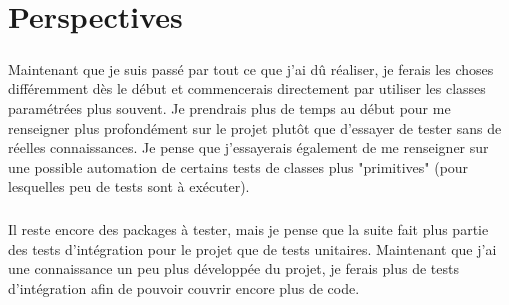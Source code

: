 \chapter{Perspectives}

\paragraph{}
Maintenant que je suis passé par tout ce que j'ai dû réaliser, je ferais les choses différemment dès le début et commencerais directement par utiliser les classes paramétrées plus souvent. Je prendrais plus de temps au début pour me renseigner plus profondément sur le projet plutôt que d'essayer de tester sans de réelles connaissances. Je pense que j'essayerais également de me renseigner sur une possible automation de certains tests de classes plus "primitives" (pour lesquelles peu de tests sont à exécuter).

\paragraph{}
Il reste encore des packages à tester, mais je pense que la suite fait plus partie des tests d'intégration pour le projet que de tests unitaires. Maintenant que j'ai une connaissance un peu plus développée du projet, je ferais plus de tests d'intégration afin de pouvoir couvrir encore plus de code.